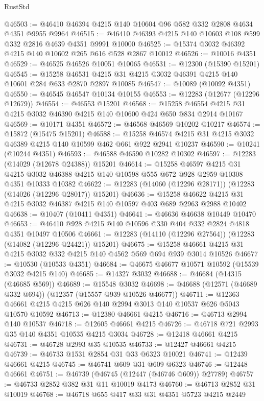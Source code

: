 \begin{lexlean}{RustStd}
\begin{coremodule}
@46503 := @46410 @46394 @4215 @140 @10604 @96 @582 @332 @2808 @4634 @4351 @9955 @9964
@46515 := @46410 @46393 @4215 @140 @10603 @108 @599 @332 @2816 @4639 @4351 @9991 @10000
@46525 := @15374 @3032 @46392 @4215 @140 @10602 @265 @616 @528 @2867 @10012
@46526 := @10016 @4351
@46529 := @46525 @46526 @10051 @10065
@46531 := @12300 (@15390 @15201)
@46545 := @15258 @46531 @4215 @31 @4215 @3032 @46391 @4215 @140 @10601 @284 @633 @2870 @2897 @10085
@46547 := @10089 (@10092 @4351)
@46550 := @46545 @46547 @10134 @10155
@46553 := @12283 (@12677 (@12296 @12679))
@46554 := @46553 @15201
@46568 := @15258 @46554 @4215 @31 @4215 @3032 @46390 @4215 @140 @10600 @424 @650 @834 @2914 @10167
@46569 := @10171 @4351
@46572 := @46568 @46569 @10202 @10217
@46574 := @15872 (@15475 @15201)
@46588 := @15258 @46574 @4215 @31 @4215 @3032 @46389 @4215 @140 @10599 @462 @661 @922 @2941 @10237
@46590 := @10241 (@10244 @4351)
@46593 := @46588 @46590 @10282 @10302
@46597 := @12283 (@14029 (@12678 @24388)) @15201
@46614 := @15258
    @46597
    @4215
    @31
    @4215
    @3032
    @46388
    @4215
    @140
    @10598
    @555
    @672
    @928
    @2959
    @10308
    @4351
    @10333
    @10382
@46622 := @12283 (@14060 (@12296 @28171)) (@12283 (@14026 (@12296 @28017)) @15201)
@46636 := @15258 @46622 @4215 @31 @4215 @3032 @46387 @4215 @140 @10597 @403 @689 @2963 @2988 @10402
@46638 := @10407 (@10411 @4351)
@46641 := @46636 @46638 @10449 @10470
@46653 := @46410 @928 @4215 @140 @10596 @330 @404 @332 @2824 @4818 @4351 @10497 @10506
@46661 := @12283 (@14110 (@12296 @27564)) (@12283 (@14082 (@12296 @24421)) @15201)
@46675 := @15258 @46661 @4215 @31 @4215 @3032 @332 @4215 @140 @4562 @569 @694 @939 @3014 @10526
@46677 := @10530 (@10533 @4351)
@46684 := @46675 @46677 @10571 @10592 (@15539 @3032 @4215 @140)
@46685 := @14327 @3032
@46688 := @46684 (@14315 (@46685 @569))
@46689 := @15548 @3032
@46698 := @46688 (@12571 (@46689 @332 @694)) (@12357 (@15557 @939 @10526 @46677))
@46711 := @12363 @46661 @4215 @4215 @626 @140 @2994 @3013 @140 @10537 @626 @5043 @10570 @10592
@46713 := @12380 @46661 @4215
@46716 := @46713 @2994 @140 @10537
@46718 := @12605 @46661 @4215
@46726 := @46718 @721 @2993 @35 @140 @4351 @10535 @4215 @3034
@46728 := @12418 @46661 @4215
@46731 := @46728 @2993 @35 @10535
@46733 := @12427 @46661 @4215
@46739 := @46733 @1531 @2854 @31 @33 @6323 @10021
@46741 := @12439 @46661 @4215
@46745 := @46741 @609 @31 @609 @6323
@46746 := @12448 @46661
@46751 := @46739 (@46745 (@12447 (@46746 @609)) @27789)
@46757 := @46733 @2852 @382 @31 @11 @10019 @4173
@46760 := @46713 @2852 @31 @10019
@46768 := @46718 @655 @417 @33 @31 @4351 @5723 @4215 @2449

\end{coremodule}
\end{lexlean}
